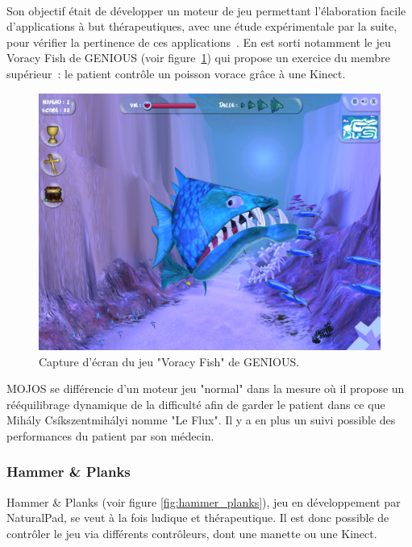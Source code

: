 \paragraph{}
Son objectif était de développer un moteur de jeu permettant 
l'élaboration facile d'applications à but thérapeutiques, avec une étude 
expérimentale
par la suite, pour vérifier la pertinence de ces applications~\cite{mojos}. En est sorti 
notamment le jeu Voracy Fish de GENIOUS (voir figure~\ref{fig:voracy_fish})
qui propose un exercice du membre supérieur~: le patient contrôle un poisson 
vorace grâce à une Kinect.

\begin{figure}[h!]
\centering
\includegraphics[width=0.8\linewidth]{../images/voracy_fish}
\caption{Capture d'écran du jeu "Voracy Fish" de GENIOUS.}
\label{fig:voracy_fish}
\end{figure}

MOJOS se différencie d'un moteur jeu "normal" dans la mesure où il propose
un rééquilibrage dynamique de la difficulté afin de garder le patient dans
ce que Mihály Csíkszentmihályi nomme "Le Flux"\cite{flow}. Il y a en plus un suivi possible 
des performances du patient par son médecin.

\subsubsection{Hammer \& Planks}
Hammer \& Planks (voir figure \ref{fig:hammer_planks}), jeu en développement par NaturalPad, se veut à la fois 
ludique et thérapeutique. Il est donc possible de contrôler le jeu via différents contrôleurs, dont une manette ou une Kinect.

